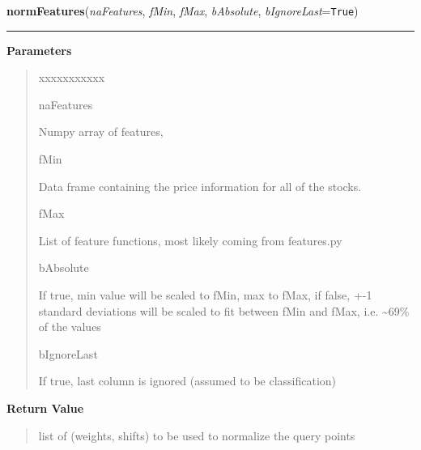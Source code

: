     \vspace{0.5ex}

\hspace{.8\funcindent}\begin{boxedminipage}{\funcwidth}

    \raggedright \textbf{normFeatures}(\textit{naFeatures}, \textit{fMin}, \textit{fMax}, \textit{bAbsolute}, \textit{bIgnoreLast}={\tt True})

    \vspace{-1.5ex}

    \rule{\textwidth}{0.5\fboxrule}
\setlength{\parskip}{2ex}
\setlength{\parskip}{1ex}
      \textbf{Parameters}
      \vspace{-1ex}

      \begin{quote}
        \begin{Ventry}{xxxxxxxxxxx}

          \item[naFeatures]

          Numpy array of features,

          \item[fMin]

          Data frame containing the price information for all of the 
          stocks.

          \item[fMax]

          List of feature functions, most likely coming from features.py

          \item[bAbsolute]

          If true, min value will be scaled to fMin, max to fMax, if false,
          +-1 standard deviations will be scaled to fit between fMin and 
          fMax, i.e. {\textasciitilde}69\% of the values

          \item[bIgnoreLast]

          If true, last column is ignored (assumed to be classification)

        \end{Ventry}

      \end{quote}

      \textbf{Return Value}
    \vspace{-1ex}

      \begin{quote}
      list of (weights, shifts) to be used to normalize the query points

      \end{quote}

    \end{boxedminipage}

